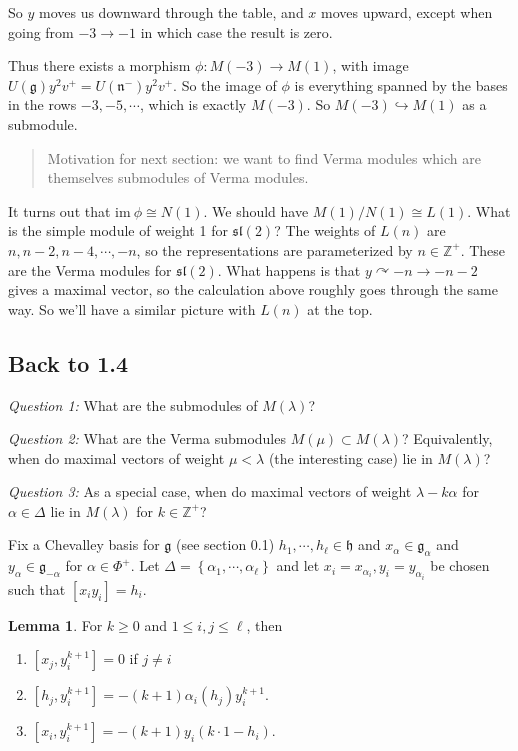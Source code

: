 \documentclass[11pt]{scrartcl}
\theoremstyle{definition}
\theoremstyle{theorem}
\newtheorem{lemma}[theorem]{Lemma}
\theoremstyle{proof}
\theoremstyle{definition}
\theoremstyle{break}
\theoremstyle{problem}
\newcommand{\ZZ}[0]{{\mathbb{Z}}}
\newcommand{\im}[0]{{\text{im}~}}
\newcommand{\actson}[0]{\curvearrowright}
\newcommand{\injects}[0]{\hookrightarrow}
\newcommand{\lieg}[0]{{\mathfrak{g}}}
\newcommand{\lieh}[0]{{\mathfrak{h}}}
\newcommand{\lien}[0]{{\mathfrak{n}}}
\newcommand{\liesl}[0]{{\mathfrak{sl}}}
\newcommand{\theset}[1]{\left\{{#1}\right\}}
\renewcommand{\to}[0]{\longrightarrow}
\begin{document}
So \(y\) moves us downward through the table, and \(x\) moves upward,
except when going from \(-3\to -1\) in which case the result is zero.

Thus there exists a morphism \(\phi: M(-3) \to M(1)\), with image
\(U(\lieg) y^2 v^+ = U(\lien^-) y^2 v^+\). So the image of \(\phi\) is
everything spanned by the bases in the rows \(-3, -5, \cdots\), which is
exactly \(M(-3)\). So \(M(-3) \injects M(1)\) as a submodule.

\begin{quote}
Motivation for next section: we want to find Verma modules which are
themselves submodules of Verma modules.
\end{quote}

It turns out that \(\im \phi \cong N(1)\). We should have
\(M(1) / N(1) \cong L(1)\). What is the simple module of weight 1 for
\(\liesl(2)\)? The weights of \(L(n)\) are \(n, n-2, n-4, \cdots, -n\),
so the representations are parameterized by \(n\in \ZZ^{+}\). These are
the Verma modules for \(\liesl(2)\). What happens is that
\(y\actson -n \to -n-2\) gives a maximal vector, so the calculation
above roughly goes through the same way. So we'll have a similar picture
with \(L(n)\) at the top.

\hypertarget{back-to-1.4}{%
\subsection{Back to 1.4}\label{back-to-1.4}}

\emph{Question 1:} What are the submodules of \(M(\lambda)\)?

\emph{Question 2:} What are the Verma submodules
\(M(\mu) \subset M(\lambda)\)? Equivalently, when do maximal vectors of
weight \(\mu < \lambda\) (the interesting case) lie in \(M(\lambda)\)?

\emph{Question 3:} As a special case, when do maximal vectors of weight
\(\lambda - k\alpha\) for \(\alpha \in \Delta\) lie in \(M(\lambda)\)
for \(k\in \ZZ^+\)?

Fix a Chevalley basis for \(\lieg\) (see section 0.1)
\(h_1, \cdots, h_\ell \in \lieh\) and \(x_\alpha \in \lieg_\alpha\) and
\(y_\alpha \in \lieg_{-\alpha}\) for \(\alpha \in \Phi^+\). Let
\(\Delta = \theset{\alpha_1, \cdots, \alpha_\ell}\) and let
\(x_i = x_{\alpha_i}, y_i = y_{\alpha_i}\) be chosen such that
\([x_i y_i] = h_i\).

\begin{lemma}

For \(k\geq 0\) and \(1\leq i, j \leq \ell\), then

\begin{enumerate}
\def\labelenumi{\alph{enumi}.}
\item
  \([x_j, y_i^{k+1}] = 0\) if \(j\neq i\)
\item
  \([h_j, y_i^{k+1}] = -(k+1) \alpha_i(h_j) y_i^{k+1}\).
\item
  \([x_i, y_i^{k+1}] = -(k+1) y_i(k\cdot 1 - h_i)\).
\end{enumerate}

\end{lemma}
\end{document}
